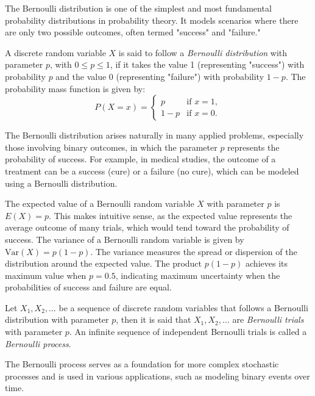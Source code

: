 The Bernoulli distribution is one of the simplest and most fundamental probability distributions in probability theory. It models scenarios where there are only two possible outcomes, often termed "success" and "failure."

\begin{definition}
A discrete random variable $X$ is said to follow a \emph{Bernoulli distribution} with parameter $p$, with $0 \leq p \leq 1$, if it takes the value 1 (representing "success") with probability $p$ and the value 0 (representing "failure") with probability $1-p$. The probability mass function is given by:
\[
P(X = x) = 
\begin{cases} 
p & \text{if } x = 1, \\
1 - p & \text{if } x = 0.
\end{cases}
\]
\end{definition}

The Bernoulli distribution arises naturally in many applied problems, especially those involving binary outcomes, in which the parameter $p$ represents the probability of success. For example, in medical studies, the outcome of a treatment can be a success (cure) or a failure (no cure), which can be modeled using a Bernoulli distribution.

The expected value of a Bernoulli random variable $X$ with parameter $p$ is $E(X) = p$. This makes intuitive sense, as the expected value represents the average outcome of many trials, which would tend toward the probability of success. The variance of a Bernoulli random variable is given by $\text{Var}(X) = p(1 - p)$. The variance measures the spread or dispersion of the distribution around the expected value. The product $p(1 - p)$ achieves its maximum value when $p = 0.5$, indicating maximum uncertainty when the probabilities of success and failure are equal.

\begin{definition}
Let $X_{1}, X_{2}, \ldots$ be a sequence of discrete random variables that follows a Bernoulli distribution with parameter $p$, then it is said that $X_{1}, X_{2}, \ldots$ are \emph{Bernoulli trials} with parameter $p$. An infinite sequence of independent Bernoulli trials is called a \emph{Bernoulli process}.
\end{definition}

The Bernoulli process serves as a foundation for more complex stochastic processes and is used in various applications, such as modeling binary events over time.

